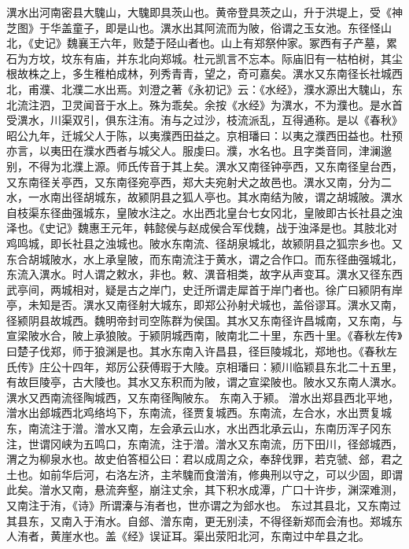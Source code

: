 \documentclass[12pt,UTF8]{ctexbook}
\begin{document}
潩水出河南密县大騩山，大騩即具茨山也。黄帝登具茨之山，升于洪堤上，受《神芝图》于华盖童子，即是山也。潩水出其阿流而为陂，俗谓之玉女池。东径怪山北，《史记》魏襄王六年，败楚于陉山者也。山上有郑祭仲家。冢西有子产墓，累石为方坟，坟东有庙，并东北向郑城。杜元凯言不忘本。际庙旧有一枯柏树，其尘根故株之上，多生稚柏成林，列秀青青，望之，奇可嘉矣。潩水又东南径长社城西北，甫濮、北濮二水出焉。刘澄之著《永初记》云：《水经》，濮水源出大騩山，东北流注泗，卫灵闻音于水上。殊为乖矣。余按《水经》为潩水，不为濮也。是水首受潩水，川渠双引，俱东注洧。洧与之过沙，枝流派乱，互得通称。是以《春秋》昭公九年，迁城父人于陈，以夷濮西田益之。京相璠曰：以夷之濮西田益也。杜预亦言，以夷田在濮水西者与城父人。服虔曰。濮，水名也。且字类音同，津澜邈别，不得为北濮上源。师氏传音于其上矣。潩水又南径钟亭西，又东南径皇台西，又东南径关亭西，又东南径宛亭西，郑大夫宛射犬之故邑也。潩水又南，分为二水，一水南出径胡城东，故颍阴县之狐人亭也。其水南结为陂，谓之胡城陂。潩水自枝渠东径曲强城东，皇陂水注之。水出西北皇台七女冈北，皇陂即古长社县之浊泽也。《史记》魏惠王元年，韩懿侯与赵成侯合军伐魏，战于浊泽是也。其肢北对鸡鸣城，即长社县之浊城也。陂水东南流、径胡泉城北，故颍阴县之狐宗乡也。又东合胡城陂水，水上承皇陂，而东南流注于黄水，谓之合作口。而东径曲强城北，东流入潩水。时人谓之敕水，非也。敕、潩音相类，故字从声变耳。潩水又径东西武亭间，两城相对，疑是古之岸门，史迁所谓走犀首于岸门者也。徐广曰颍阴有岸亭，未知是否。潩水又南径射大城东，即郑公孙射犬城也，盖俗谬耳。潩水又南，径颍阴县故城西。魏明帝封司空陈群为侯国。其水又东南径许昌城南，又东南，与宣梁陂水合，陂上承狼陂。于颍阴城西南，陂南北二十里，东西十里。《春秋左传》曰楚子伐郑，师于狼渊是也。其水东南入许昌县，径巨陵城北，郑地也。《春秋左氏传》庄公十四年，郑厉公获傅瑕于大陵。京相璠曰：颍川临颖县东北二十五里，有故巨陵亭，古大陵也。其水又东积而为陂，谓之宣梁陂也。陂水又东南人潩水。潩水又西南流径陶城西，又东南径陶陂东。
东南入于颍。
潧水出郑县西北平地，潧水出郐城西北鸡络坞下，东南流，径贾复城西。东南流，左合水，水出贾复城东，南流注于潧。潧水又南，左会承云山水，水出西北承云山，东南历浑子冈东注，世谓冈峡为五鸣口，东南流，注于潧。潧水又东南流，历下田川，径郐城西，渭之为柳泉水也。故史伯答桓公曰：君以成周之众，奉辞伐罪，若克虢、郐，君之土也。如前华后河，右洛左济，主芣騩而食潧洧，修典刑以守之，可以少固，即谓此矣。潧水又南，悬流奔壑，崩注丈余，其下积水成潭，广口十许步，渊深难测，又南注于洧，《诗》所谓溱与洧者也，世亦谓之为郐水也。
东过其县北，又东南过其县东，又南入于洧水。自郐、潧东南，更无别渎，不得径新郑而会洧也。郑城东人洧者，黄崖水也。盖《经》误证耳。渠出荥阳北河，东南过中牟县之北。
\end{document}
